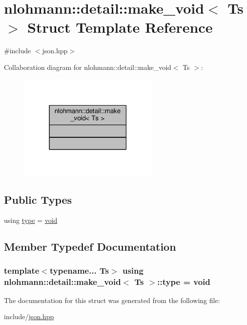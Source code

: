 \hypertarget{structnlohmann_1_1detail_1_1make__void}{}\section{nlohmann\+:\+:detail\+:\+:make\+\_\+void$<$ Ts $>$ Struct Template Reference}
\label{structnlohmann_1_1detail_1_1make__void}


{\ttfamily \#include $<$json.\+hpp$>$}



Collaboration diagram for nlohmann\+:\+:detail\+:\+:make\+\_\+void$<$ Ts $>$\+:
\nopagebreak
\begin{figure}[H]
\begin{center}
\leavevmode
\includegraphics[width=198pt]{structnlohmann_1_1detail_1_1make__void__coll__graph}
\end{center}
\end{figure}
\subsection*{Public Types}
\begin{DoxyCompactItemize}
\item 
using \hyperlink{structnlohmann_1_1detail_1_1make__void_a8961e24ae3b2cb65ec47d1ce805d94e4}{type} = \hyperlink{namespacenlohmann_1_1detail_a59fca69799f6b9e366710cb9043aa77d}{void}
\end{DoxyCompactItemize}


\subsection{Member Typedef Documentation}
\subsubsection[{\texorpdfstring{type}{type}}]{\setlength{\rightskip}{0pt plus 5cm}template$<$typename... Ts$>$ using {\bf nlohmann\+::detail\+::make\+\_\+void}$<$ Ts $>$\+::{\bf type} =  {\bf void}}\hypertarget{structnlohmann_1_1detail_1_1make__void_a8961e24ae3b2cb65ec47d1ce805d94e4}{}\label{structnlohmann_1_1detail_1_1make__void_a8961e24ae3b2cb65ec47d1ce805d94e4}


The documentation for this struct was generated from the following file\+:\begin{DoxyCompactItemize}
\item 
include/\hyperlink{json_8hpp}{json.\+hpp}\end{DoxyCompactItemize}
